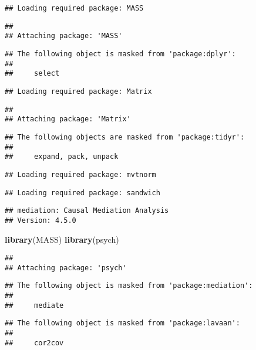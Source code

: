 \documentclass[]{article}
\newenvironment{Shaded}{\begin{snugshade}}{\end{snugshade}}
\newcommand{\KeywordTok}[1]{\textcolor[rgb]{0.13,0.29,0.53}{\textbf{#1}}}
\newcommand{\NormalTok}[1]{#1}
\begin{document}
\begin{verbatim}
## Loading required package: MASS
\end{verbatim}

\begin{verbatim}
## 
## Attaching package: 'MASS'
\end{verbatim}

\begin{verbatim}
## The following object is masked from 'package:dplyr':
## 
##     select
\end{verbatim}

\begin{verbatim}
## Loading required package: Matrix
\end{verbatim}

\begin{verbatim}
## 
## Attaching package: 'Matrix'
\end{verbatim}

\begin{verbatim}
## The following objects are masked from 'package:tidyr':
## 
##     expand, pack, unpack
\end{verbatim}

\begin{verbatim}
## Loading required package: mvtnorm
\end{verbatim}

\begin{verbatim}
## Loading required package: sandwich
\end{verbatim}

\begin{verbatim}
## mediation: Causal Mediation Analysis
## Version: 4.5.0
\end{verbatim}

\begin{Shaded}
\begin{Highlighting}[]
\KeywordTok{library}\NormalTok{(MASS)}
\KeywordTok{library}\NormalTok{(psych)}
\end{Highlighting}
\end{Shaded}

\begin{verbatim}
## 
## Attaching package: 'psych'
\end{verbatim}

\begin{verbatim}
## The following object is masked from 'package:mediation':
## 
##     mediate
\end{verbatim}

\begin{verbatim}
## The following object is masked from 'package:lavaan':
## 
##     cor2cov
\end{verbatim}
\end{document}
